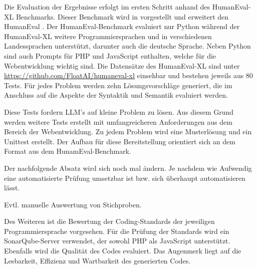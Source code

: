 Die Evaluation der Ergebnisse erfolgt im ersten Schritt anhand des HumanEval-XL Benchmarks. Dieser Benchmark wird in \cite{peng-2024} vorgestellt und erweitert den HumanEval \cite{chen-2021}. Der HumanEval-Benchmark evaluiert nur Python während der HumanEval-XL weitere Programmiersprachen und in verschiedenen Landessprachen unterstützt, darunter auch die deutsche Sprache. Neben Python sind auch Prompts für PHP und JavaScript enthalten, welche für die Webentwicklung wichtig sind. Die Datensätze des HumanEval-XL sind unter \href{https://github.com/FloatAI/humaneval-xl}{https://github.com/FloatAI/humaneval-xl} einsehbar und bestehen jeweils aus 80 Tests. Für jedes Problem werden zehn Lösungsvorschläge generiert, die im Anschluss auf die Aspekte der Syntaktik und Semantik evaluiert werden.\vspace{0.2cm}

Diese Tests fordern LLM's auf kleine Problem zu lösen. Aus diesem Grund werden weitere Tests erstellt mit umfangreicheren Anforderungen aus dem Bereich der Webentwicklung. Zu jedem Problem wird eine Musterlösung und ein Unittest erstellt. Der Aufbau für diese Bereitstellung orientiert sich an dem Format aus dem HunamEval-Benchmark.\vspace{0.2cm}

\begin{tcolorbox}[
	enhanced,
	colback=red!5!white,
	colframe=red!75!black!50,
	title= Mein roter Faden
	]
	Der nachfolgende Absatz wird sich noch mal ändern.  Je nachdem wie Aufwendig eine automatisierte Prüfung umsetzbar ist bzw. sich überhaupt automatisieren lässt.\vspace{0.2cm}
	
	Evtl. manuelle Auswertung von Stichproben.
\end{tcolorbox}

Des Weiteren ist die Bewertung der Coding-Standards der jeweiligen Programmiersprache vorgesehen. Für die Prüfung der Standards wird ein SonarQube-Server verwendet, der sowohl PHP als JavaScript unterstützt. Ebenfalls wird die Qualität des Codes evaluiert. Das Augenmerk liegt auf die Lesbarkeit, Effizienz und Wartbarkeit des generierten Codes.\vspace{0.2cm}



